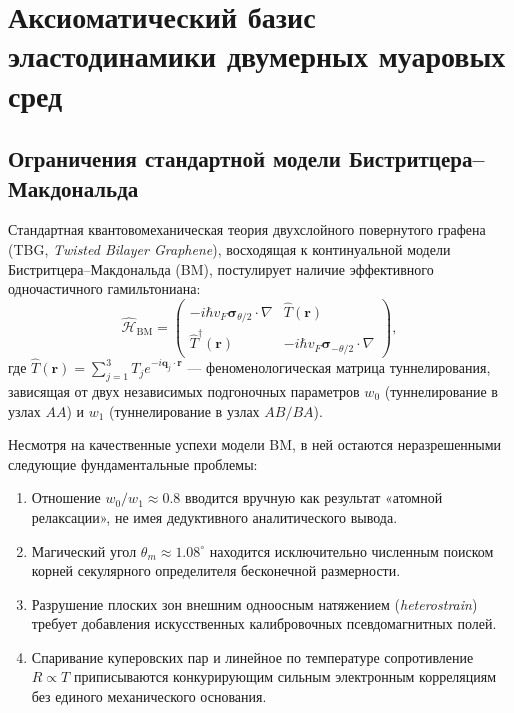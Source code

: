 \documentclass[12pt,a4paper]{article}
\begin{document}
	\newpage
	\tableofcontents
	\newpage
	
	\section{Аксиоматический базис эластодинамики двумерных муаровых сред}
	
	\subsection{Ограничения стандартной модели Бистритцера--Макдональда}
	Стандартная квантовомеханическая теория двухслойного повернутого графена (TBG, \textit{Twisted Bilayer Graphene}), восходящая к континуальной модели Бистритцера--Макдональда (BM), постулирует наличие эффективного одночастичного гамильтониана:
	\begin{equation}
		\hat{\mathcal{H}}_{\text{BM}} = \begin{pmatrix} 
			-i \hbar v_F \boldsymbol{\sigma}_{\theta/2} \cdot \nabla & \hat{T}(\mathbf{r}) \\ 
			\hat{T}^\dagger(\mathbf{r}) & -i \hbar v_F \boldsymbol{\sigma}_{-\theta/2} \cdot \nabla 
		\end{pmatrix},
	\end{equation}
	где $\hat{T}(\mathbf{r}) = \sum_{j=1}^3 T_j e^{-i \mathbf{q}_j \cdot \mathbf{r}}$ — феноменологическая матрица туннелирования, зависящая от двух независимых подгоночных параметров $w_0$ (туннелирование в узлах $AA$) и $w_1$ (туннелирование в узлах $AB/BA$). 
	
	Несмотря на качественные успехи модели BM, в ней остаются неразрешенными следующие фундаментальные проблемы:
	\begin{enumerate}
		\item Отношение $w_0/w_1 \approx 0.8$ вводится вручную как результат «атомной релаксации», не имея дедуктивного аналитического вывода.
		\item Магический угол $\theta_m \approx 1.08^\circ$ находится исключительно численным поиском корней секулярного определителя бесконечной размерности.
		\item Разрушение плоских зон внешним одноосным натяжением (\textit{heterostrain}) требует добавления искусственных калибровочных псевдомагнитных полей.
		\item Спаривание куперовских пар и линейное по температуре сопротивление $R \propto T$ приписываются конкурирующим сильным электронным корреляциям без единого механического основания.
	\end{enumerate}
	
\end{document}
